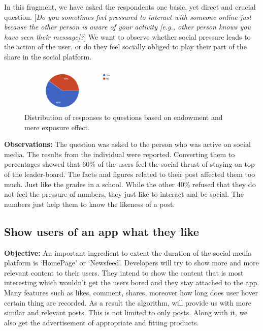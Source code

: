 \documentclass[conference]{IEEEtran}
\begin{document}
In this fragment, we have asked the respondents one basic, yet direct and crucial question. [\textit{Do you sometimes feel pressured to interact with someone online just because the other person is aware of your activity [e.g., other person knows you have seen their message]?}] We want to observe whether social pressure leads to the action of the user, or do they feel socially obliged to play their part of the share in the social platform.\


\begin{figure}[htbp]
\centerline{\includegraphics[width=0.5\textwidth]{Social Pressure.png}}
\caption{Distribution of responses to questions based on endowment and mere exposure effect.}
\label{sr}
\end{figure}

\textbf{Observations:} The question was asked to the person who was active on social media. The results from the individual were reported. Converting them to percentages showed that 60\% of the users feel the social thrust of staying on top of the leader-board. The facts and figures related to their post affected them too much. Just like the grades in a school. While the other 40\% refused that they do not feel the pressure of numbers, they just like to interact and be social. The numbers just help them to know the likeness of a post. 

\subsection{Show users of an app what they like}
\textbf{Objective:} An important ingredient to extent the duration of the social media platform is ‘HomePage’ or ‘Newsfeed’. Developers will try to show more and more relevant content to their users. They intend to show the content that is most interesting which wouldn’t get the users bored and they stay attached to the app. Many features such as likes, comment, shares, moreover how long does user hover certain thing are recorded. As a result the algorithm, will provide us with more similar and relevant posts. This is not limited to only posts. Along with it, we also get the advertisement of appropriate and fitting products.
\end{document}
